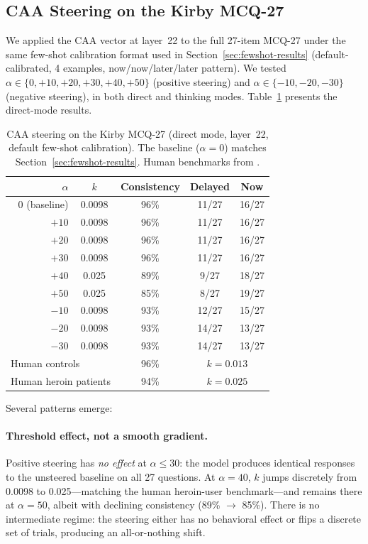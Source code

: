 \subsection{CAA Steering on the Kirby MCQ-27}
\label{sec:caa-kirby}

We applied the CAA vector at layer~22 to the full 27-item MCQ-27 under the same few-shot calibration format used in Section~\ref{sec:fewshot-results} (default-calibrated, 4 examples, now/now/later/later pattern). We tested $\alpha \in \{0, +10, +20, +30, +40, +50\}$ (positive steering) and $\alpha \in \{-10, -20, -30\}$ (negative steering), in both direct and thinking modes. Table~\ref{tab:caa-direct} presents the direct-mode results.

\begin{table}[H]
\centering
\caption{CAA steering on the Kirby MCQ-27 (direct mode, layer~22, default few-shot calibration). The baseline ($\alpha = 0$) matches Section~\ref{sec:fewshot-results}. Human benchmarks from \citet{kirby1999}.}
\label{tab:caa-direct}
\begin{tabular}{rcccc}
\toprule
\textbf{$\alpha$} & \textbf{$k$} & \textbf{Consistency} & \textbf{Delayed} & \textbf{Now} \\
\midrule
0 (baseline) & 0.0098 & 96\% & 11/27 & 16/27 \\
$+10$ & 0.0098 & 96\% & 11/27 & 16/27 \\
$+20$ & 0.0098 & 96\% & 11/27 & 16/27 \\
$+30$ & 0.0098 & 96\% & 11/27 & 16/27 \\
$+40$ & 0.025 & 89\% & 9/27 & 18/27 \\
$+50$ & 0.025 & 85\% & 8/27 & 19/27 \\
\midrule
$-10$ & 0.0098 & 93\% & 12/27 & 15/27 \\
$-20$ & 0.0098 & 93\% & 14/27 & 13/27 \\
$-30$ & 0.0098 & 93\% & 14/27 & 13/27 \\
\midrule
\multicolumn{2}{l}{Human controls} & 96\% & \multicolumn{2}{c}{$k = 0.013$} \\
\multicolumn{2}{l}{Human heroin patients} & 94\% & \multicolumn{2}{c}{$k = 0.025$} \\
\bottomrule
\end{tabular}
\end{table}

Several patterns emerge:

\paragraph{Threshold effect, not a smooth gradient.} Positive steering has \emph{no effect} at $\alpha \leq 30$: the model produces identical responses to the unsteered baseline on all 27 questions. At $\alpha = 40$, $k$ jumps discretely from 0.0098 to 0.025---matching the human heroin-user benchmark---and remains there at $\alpha = 50$, albeit with declining consistency (89\% $\to$ 85\%). There is no intermediate regime: the steering either has no behavioral effect or flips a discrete set of trials, producing an all-or-nothing shift.

